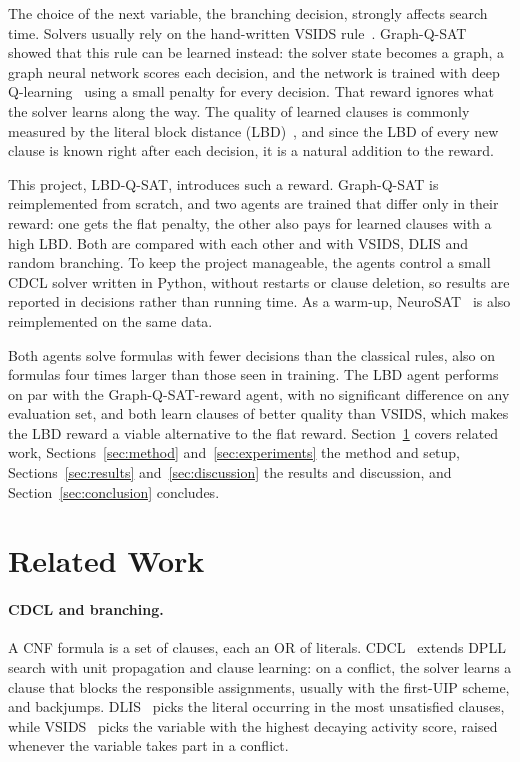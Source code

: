 \documentclass[11pt,a4paper]{article}
\begin{document}
The choice of the next variable, the branching decision, strongly affects search time. Solvers usually rely on the hand-written VSIDS rule~\cite{moskewicz2001chaff}. Graph-Q-SAT~\cite{kurin2020gqsat} showed that this rule can be learned instead: the solver state becomes a graph, a graph neural network scores each decision, and the network is trained with deep Q-learning~\cite{mnih2015dqn} using a small penalty for every decision. That reward ignores what the solver learns along the way. The quality of learned clauses is commonly measured by the literal block distance (LBD)~\cite{audemard2009glucose}, and since the LBD of every new clause is known right after each decision, it is a natural addition to the reward.

This project, LBD-Q-SAT, introduces such a reward. Graph-Q-SAT is reimplemented from scratch, and two agents are trained that differ only in their reward: one gets the flat penalty, the other also pays for learned clauses with a high LBD. Both are compared with each other and with VSIDS, DLIS and random branching. To keep the project manageable, the agents control a small CDCL solver written in Python, without restarts or clause deletion, so results are reported in decisions rather than running time. As a warm-up, NeuroSAT~\cite{selsam2019neurosat} is also reimplemented on the same data.

Both agents solve formulas with fewer decisions than the classical rules, also on formulas four times larger than those seen in training. The LBD agent performs on par with the Graph-Q-SAT-reward agent, with no significant difference on any evaluation set, and both learn clauses of better quality than VSIDS, which makes the LBD reward a viable alternative to the flat reward. Section~\ref{sec:related} covers related work, Sections~\ref{sec:method} and~\ref{sec:experiments} the method and setup, Sections~\ref{sec:results} and~\ref{sec:discussion} the results and discussion, and Section~\ref{sec:conclusion} concludes.

\section{Related Work}
\label{sec:related}

\paragraph{CDCL and branching.} A CNF formula is a set of clauses, each an OR of literals. CDCL~\cite{marques1999grasp} extends DPLL search with unit propagation and clause learning: on a conflict, the solver learns a clause that blocks the responsible assignments, usually with the first-UIP scheme, and backjumps. DLIS~\cite{marques1999branching} picks the literal occurring in the most unsatisfied clauses, while VSIDS~\cite{moskewicz2001chaff} picks the variable with the highest decaying activity score, raised whenever the variable takes part in a conflict.
\end{document}
